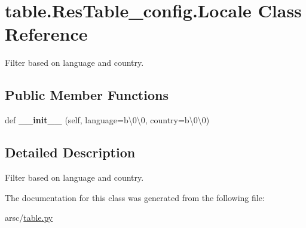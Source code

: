 \hypertarget{classtable_1_1ResTable__config_1_1Locale}{}\section{table.\+Res\+Table\+\_\+config.\+Locale Class Reference}
\label{classtable_1_1ResTable__config_1_1Locale}


Filter based on language and country.  


\subsection*{Public Member Functions}
\begin{DoxyCompactItemize}
\item 
\mbox{\label{classtable_1_1ResTable__config_1_1Locale_af75347cb173aeee3ec769da322adf519}} 
def {\bfseries \+\_\+\+\_\+init\+\_\+\+\_\+} (self, language=b\textquotesingle{}\textbackslash{}0\textbackslash{}0\textquotesingle{}, country=b\textquotesingle{}\textbackslash{}0\textbackslash{}0\textquotesingle{})
\end{DoxyCompactItemize}


\subsection{Detailed Description}
Filter based on language and country. 

The documentation for this class was generated from the following file\+:\begin{DoxyCompactItemize}
\item 
arsc/\mbox{\hyperlink{table_8py}{table.\+py}}\end{DoxyCompactItemize}
